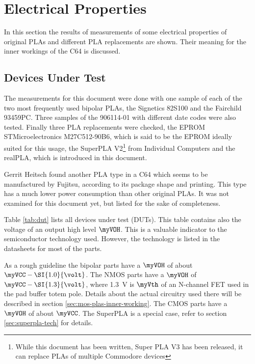 \section{Electrical Properties}

In this section the results of measurements of some electrical properties of
original PLAs and different PLA replacements are shown. Their meaning for
the inner workings of the C64 is discussed.

\subsection{Devices Under Test}

The measurements for this document were done with one sample of each of the
two most frequently used bipolar PLAs, the Signetics 82S100 and the
Fairchild 93459PC. Three samples of the 906114-01 with different date codes
were also tested. Finally three PLA replacements were checked, the EPROM
STMicroelectronics M27C512-90B6, which is said to be the EPROM ideally
suited for this usage, the SuperPLA V2\footnote{While this document has been
written, Super PLA V3 has been released, it can replace PLAs of multiple
Commodore devices} from Individual Computers and the realPLA, which is
introduced in this document.

Gerrit Heitsch found another PLA type in a C64 which seems to be
manufactured by Fujitsu, according to its package shape and printing. This
type has a much lower power consumption than other original PLAs. It was not
examined for this document yet, but listed for the sake of completeness.

Table \ref{tab:dut} lists all devices under test (DUTs). This table contains
also the voltage of an output high level $\myVOH$. This is a valuable
indicator to the semiconductor technology used. However, the technology is
listed in the datasheets for most of the parts.

As a rough guideline the bipolar parts have a $\myVOH$ of about
$\myVCC - \SI{1.0}{\volt}$. The NMOS parts have a $\myVOH$ of $\myVCC -
\SI{1.3}{\volt}$, where \SI{1.3}{\volt} is $\myVth$ of an N-channel FET used
in the pad buffer totem pole. Details about the actual circuitry used there
will be described in section \ref{sec:mos-plas-inner-working}. The CMOS parts
have a $\myVOH$ of about $\myVCC$. The SuperPLA is a special case, refer to
section \ref{sec:superpla-tech} for details.

